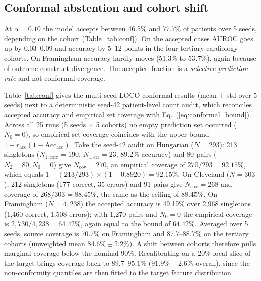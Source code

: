 \documentclass[conference]{IEEEtran}
\begin{document}
\subsection{Conformal abstention and cohort shift}\label{sec:conformal}
At $\alpha=0.10$ the model accepts between 46.5\% and 77.7\% of patients over 5 seeds, depending on the cohort (Table~\ref{tab:conf}). On the accepted cases AUROC goes up by 0.03--0.09 and accuracy by 5--12 points in the four tertiary cardiology cohorts. On Framingham accuracy hardly moves (51.3\% to 53.7\%), again because of outcome construct divergence. The accepted fraction is a \emph{selective-prediction rate} and not conformal coverage.

Table~\ref{tab:conf} gives the multi-seed LOCO conformal results (mean $\pm$ std over 5 seeds) next to a deterministic seed-42 patient-level count audit, which reconciles accepted accuracy and empirical set coverage with Eq.~(\ref{eq:conformal_bound}). Across all 25 runs (5 seeds $\times$ 5 cohorts) no empty prediction set occurred ($N_0=0$), so empirical set coverage coincides with the upper bound $1 - r_{\mathrm{acc}}(1 - \mathrm{Acc}_{\mathrm{acc}})$. Take the seed-42 audit on Hungarian ($N=293$): 213 singletons ($N_{1,\mathrm{corr}}=190$, $N_{1,\mathrm{err}}=23$, 89.2\% accuracy) and 80 pairs ($N_2=80, N_0=0$) give $N_{\mathrm{cov}}=270$, an empirical coverage of $270/293 = 92.15\%$, which equals $1 - (213/293)\times(1-0.8920) = 92.15\%$. On Cleveland ($N=303$), 212 singletons (177 correct, 35 errors) and 91 pairs give $N_{\mathrm{cov}}=268$ and coverage of $268/303 = 88.45\%$, the same as the ceiling of $88.45\%$. On Framingham ($N=4{,}238$) the accepted accuracy is 49.19\% over 2{,}968 singletons (1,460 correct, 1,508 errors); with 1{,}270 pairs and $N_0=0$ the empirical coverage is $2{,}730/4{,}238=64.42\%$, again equal to the bound of $64.42\%$. Averaged over 5 seeds, source coverage is 70.7\% on Framingham and 87.7--88.7\% on the tertiary cohorts (unweighted mean $84.6\% \pm 2.2\%$). A shift between cohorts therefore pulls marginal coverage below the nominal 90\%. Recalibrating on a 20\% local slice of the target brings coverage back to $89.7$--$95.1\%$ ($91.9\% \pm 2.6\%$ overall), since the non-conformity quantiles are then fitted to the target feature distribution.
\end{document}
